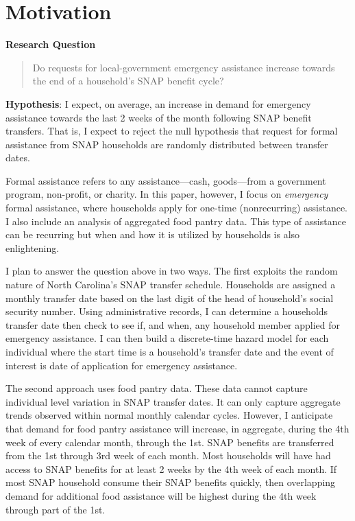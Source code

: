 \documentclass[12pt,letterpaperpaper,]{book}
\begin{document}
\section*{Motivation}\label{motivation-2}

\textbf{Research Question}

\begin{quote}
Do requests for local-government emergency assistance increase towards
the end of a household's SNAP benefit cycle?
\end{quote}

\textbf{Hypothesis}: I expect, on average, an increase in demand for
emergency assistance towards the last 2 weeks of the month following
SNAP benefit transfers. That is, I expect to reject the null hypothesis
that request for formal assistance from SNAP households are randomly
distributed between transfer dates.

Formal assistance refers to any assistance---cash, goods---from a
government program, non-profit, or charity. In this paper, however, I
focus on \emph{emergency} formal assistance, where households apply for
one-time (nonrecurring) assistance. I also include an analysis of
aggregated food pantry data. This type of assistance can be recurring
but when and how it is utilized by households is also enlightening.

I plan to answer the question above in two ways. The first exploits the
random nature of North Carolina's SNAP transfer schedule. Households are
assigned a monthly transfer date based on the last digit of the head of
household's social security number. Using administrative records, I can
determine a households transfer date then check to see if, and when, any
household member applied for emergency assistance. I can then build a
discrete-time hazard model for each individual where the start time is a
household's transfer date and the event of interest is date of
application for emergency assistance.

The second approach uses food pantry data. These data cannot capture
individual level variation in SNAP transfer dates. It can only capture
aggregate trends observed within normal monthly calendar cycles.
However, I anticipate that demand for food pantry assistance will
increase, in aggregate, during the 4th week of every calendar month,
through the 1st. SNAP benefits are transferred from the 1st through 3rd
week of each month. Most households will have had access to SNAP
benefits for at least 2 weeks by the 4th week of each month. If most
SNAP household consume their SNAP benefits quickly, then overlapping
demand for additional food assistance will be highest during the 4th
week through part of the 1st.
\end{document}
